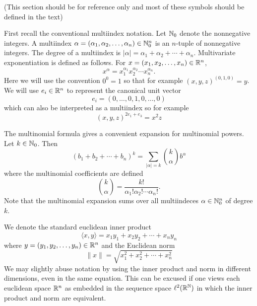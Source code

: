\begin{notationpage}

\vskip 15mm

(This section should be for reference only and most of these symbols should be defined in the text)

First recall the conventional multiindex notation. Let $\mathbb{N}_0$ denote the nonnegative integers. A multiindex $\alpha = (\alpha_1, \alpha_2, \ldots, \alpha_n) \in \mathbb{N}_0^n$ is an $n$-tuple of nonnegative integers. The degree of a multiindex is $|\alpha| = \alpha_1 + \alpha_2 + \cdots + \alpha_n$. Multivariate exponentiation is defined as follows. For $x = (x_1, x_2, \ldots, x_n) \in \mathbb{R}^n$,
\[
  x^\alpha = x_1^{\alpha_1}x_2^{\alpha_2} \cdots x_n^{\alpha_n}.
\]
Here we will use the convention $0^0 = 1$ so that for example ${(x, y, z)}^{(0, 1, 0)} = y$. We will use $e_i \in \mathbb{R}^n$ to represent the canonical unit vector
\[
  e_i = (0, \ldots, 0, 1, 0, \ldots, 0)
\]
which can also be interpreted as a multiindex so for example
\[
  (x,y,z)^{2e_1 + e_3} = x^2z
\]

The multinomial formula gives a convenient expansion for multinomial powers. Let $k \in \mathbb{N}_0$. Then
\[
  {(b_1 + b_2 + \cdots + b_n)}^k = \sum_{|\alpha| = k} \binom{k}{\alpha} b^\alpha
\] 
where the multinomial coefficients are defined
\[
  \binom{k}{\alpha} = \frac{k!}{\alpha_1! \alpha_2! \cdots \alpha_n!}.
\]
Note that the multinomial expansion sums over all multiindeces $\alpha \in \mathbb{N}_0^n$ of degree $k$.

We denote the standard euclidean inner product
\[
  \langle x,y \rangle = x_1y_1 + x_2y_2 + \cdots + x_n y_n
\]
where $y = (y_1, y_2, \ldots, y_n) \in \mathbb{R}^n$ and the Euclidean norm 
\[
  \|x\| = \sqrt{x_1^2 + x_2^2 + \cdots + x_n^2}
\]
We may slightly abuse notation by using the inner product and norm in different dimensions, even in the same equation. This can be excused if one views each euclidean space $\mathbb{R}^n$ as embedded in the sequence space $\ell^2(\mathbb{R}^{\mathbb{N}})$ in which the inner product and norm are equivalent.


\end{notationpage}
